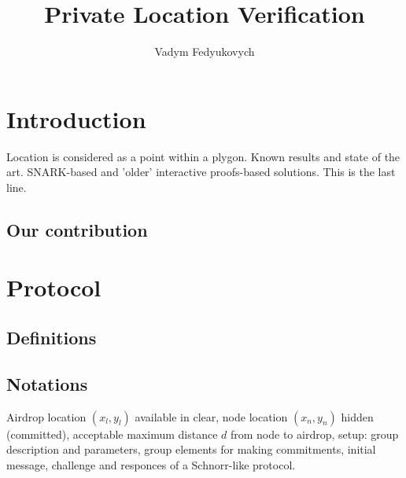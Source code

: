 \documentclass{article}
\begin{document}
\title{Private Location Verification}
\author{Vadym Fedyukovych}
\maketitle


\section{Introduction}

Location is considered as a point within a plygon. Known results and state of the art. SNARK-based and 'older' interactive proofs-based solutions. This is the last line. 

\subsection{Our contribution}

\section{Protocol}
\subsection{Definitions}


\subsection{Notations}

Airdrop location $(x_l, y_l)$ available in clear, node location $(x_n, y_n)$ hidden (committed),
acceptable maximum distance $d$ from node to airdrop,
setup: group description and parameters, group elements for making commitments,
initial message, challenge and responces of a Schnorr-like protocol.
\end{document}
